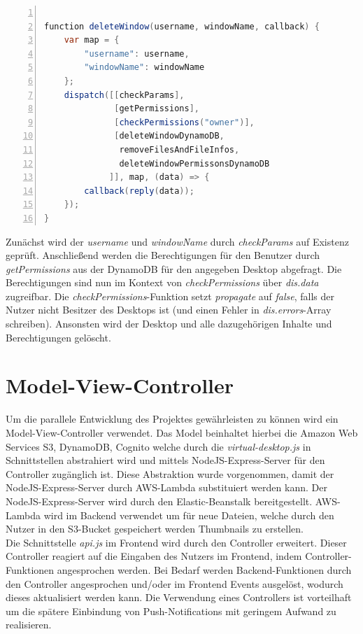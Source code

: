 \documentclass[a4paper, 12pt]{scrreprt}
\renewcommand\_{\textunderscore\allowbreak}
\begin{document}
\bigskip
\begin{lstlisting}[xleftmargin=\parindent,numbers=left,numberstyle=\small,numbersep=8pt,frame=L,mathescape=true, basicstyle=\small, language=Java]

function deleteWindow(username, windowName, callback) {
    var map = { 
        "username": username, 
        "windowName": windowName
    };
    dispatch([[checkParams], 
              [getPermissions], 
              [checkPermissions("owner")], 
              [deleteWindowDynamoDB, 
               removeFilesAndFileInfos, 
               deleteWindowPermissonsDynamoDB
             ]], map, (data) => {
        callback(reply(data));
    });
}
\end{lstlisting}
\bigskip
\noindent Zunächst wird der \textit{username} und \textit{windowName} durch \textit{checkParams} auf Existenz geprüft. Anschließend werden die Berechtigungen für den Benutzer durch \textit{getPermissions} aus der DynamoDB für den angegeben Desktop abgefragt. Die Berechtigungen sind nun im Kontext von \textit{checkPermissions} über \textit{dis.data} zugreifbar. Die \textit{checkPermissions}-Funktion setzt \textit{propagate} auf \textit{false}, falls der Nutzer nicht Besitzer des Desktops ist (und einen Fehler in \textit{dis.errors}-Array schreiben). Ansonsten wird der Desktop und alle dazugehörigen Inhalte und Berechtigungen gelöscht.    

\section{Model-View-Controller}
Um die parallele Entwicklung des Projektes gewährleisten zu können wird ein Model-View-Controller verwendet. Das Model beinhaltet hierbei die Amazon Web Services S3, DynamoDB, Cognito welche durch die \textit{virtual-desktop.js} in Schnittstellen abstrahiert wird und mittels NodeJS-Express-Server für den Controller zugänglich ist. Diese Abstraktion wurde vorgenommen, damit der NodeJS-Express-Server durch AWS-Lambda substituiert werden kann. Der NodeJS-Express-Server wird durch den Elastic-Beanstalk bereitgestellt. AWS-Lambda wird im Backend verwendet um für neue Dateien, welche durch den Nutzer in den S3-Bucket gespeichert werden Thumbnails zu erstellen.\\
Die Schnittstelle \textit{api.js} im Frontend wird durch den Controller erweitert. Dieser Controller reagiert auf die Eingaben des Nutzers im Frontend, indem Controller-Funktionen angesprochen werden. Bei Bedarf werden Backend-Funktionen durch den Controller angesprochen und/oder im Frontend Events ausgelöst, wodurch dieses aktualisiert werden kann.
Die Verwendung eines Controllers ist vorteilhaft um die spätere Einbindung von Push-Notifications mit geringem Aufwand zu realisieren.
\end{document}
